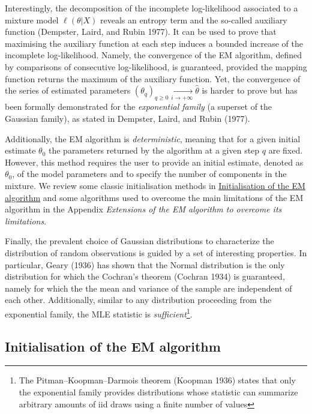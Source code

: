 Interestingly, the decomposition of the incomplete log-likelihood
associated to a mixture model \(\ell(\theta|X)\) reveals an entropy term
and the so-called auxiliary function (Dempster, Laird, and Rubin 1977). It can be used to prove that
maximising the auxiliary function at each step induces a bounded
increase of the incomplete log-likelihood. Namely, the convergence of
the EM algorithm, defined by comparisons of consecutive log-likelihood,
is guaranteed, provided the mapping function returns the maximum of the
auxiliary function. Yet, the convergence of the series of estimated
parameters
\((\theta_q)_{q \ge 0} \underset{i\to +\infty}{\longrightarrow} \hat{\theta}\)
is harder to prove but has been formally demonstrated for the \emph{exponential family} (a superset of the Gaussian family), as stated in Dempster, Laird, and Rubin (1977).

Additionally, the EM algorithm is \emph{deterministic}, meaning that for a
given initial estimate \(\theta_0\) the parameters returned by the
algorithm at a given step \(q\) are fixed. However, this method requires the user to provide an initial estimate, denoted as \(\theta_0\), of the model parameters and to specify the number of components in the mixture. We review some classic
initialisation methods in \protect\hyperlink{initialisation-of-the-em-algorithm}{Initialisation of the EM algorithm} and some
algorithms used to overcome the main limitations of the EM
algorithm in the Appendix \emph{Extensions of the EM algorithm to overcome its limitations}.

Finally, the prevalent choice of Gaussian distributions to characterize the distribution of random observations is guided by a set of interesting properties. In particular, Geary (1936) has shown that the Normal distribution is the only distribution for which the Cochran's theorem (Cochran 1934) is guaranteed, namely for which the the mean and variance of the sample are independent of each other. Additionally, similar to any distribution proceeding from the exponential family, the MLE statistic is \emph{sufficient}\footnote{The Pitman--Koopman--Darmois theorem (Koopman 1936) states that only the exponential family provides distributions whose statistic can summarize arbitrary amounts of iid draws using a finite number of values}.

\hypertarget{initialisation-of-the-em-algorithm}{%
\subsection{Initialisation of the EM algorithm}\label{initialisation-of-the-em-algorithm}}

